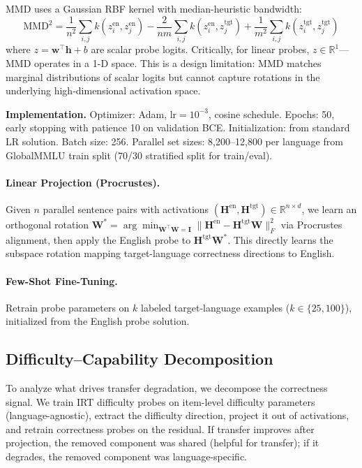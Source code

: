\documentclass[11pt,a4paper]{article}
\begin{document}
MMD uses a Gaussian RBF kernel with median-heuristic bandwidth:
\begin{equation}
\text{MMD}^2 = \frac{1}{n^2}\sum_{i,j} k(z_i^{\text{en}}, z_j^{\text{en}}) - \frac{2}{nm}\sum_{i,j} k(z_i^{\text{en}}, z_j^{\text{tgt}}) + \frac{1}{m^2}\sum_{i,j} k(z_i^{\text{tgt}}, z_j^{\text{tgt}})
\end{equation}
where $z = \mathbf{w}^\top \mathbf{h} + b$ are scalar probe logits. Critically, for linear probes, $z \in \mathbb{R}^1$---MMD operates in a 1-D space. This is a design limitation: MMD matches marginal distributions of scalar logits but cannot capture rotations in the underlying high-dimensional activation space.

\textbf{Implementation.} Optimizer: Adam, $\text{lr}=10^{-3}$, cosine schedule. Epochs: 50, early stopping with patience 10 on validation BCE. Initialization: from standard LR solution. Batch size: 256. Parallel set sizes: 8,200--12,800 per language from GlobalMMLU train split (70/30 stratified split for train/eval).

\paragraph{Linear Projection (Procrustes).}
Given $n$ parallel sentence pairs with activations $(\mathbf{H}^{\text{en}}, \mathbf{H}^{\text{tgt}}) \in \mathbb{R}^{n \times d}$, we learn an orthogonal rotation $\mathbf{W}^* = \arg\min_{\mathbf{W}^\top\mathbf{W}=\mathbf{I}} \|\mathbf{H}^{\text{en}} - \mathbf{H}^{\text{tgt}}\mathbf{W}\|_F^2$ via Procrustes alignment, then apply the English probe to $\mathbf{H}^{\text{tgt}}\mathbf{W}^*$. This directly learns the subspace rotation mapping target-language correctness directions to English.

\paragraph{Few-Shot Fine-Tuning.}
Retrain probe parameters on $k$ labeled target-language examples ($k \in \{25, 100\}$), initialized from the English probe solution.

\subsection{Difficulty--Capability Decomposition}
To analyze what drives transfer degradation, we decompose the correctness signal. We train IRT difficulty probes on item-level difficulty parameters (language-agnostic), extract the difficulty direction, project it out of activations, and retrain correctness probes on the residual. If transfer improves after projection, the removed component was shared (helpful for transfer); if it degrades, the removed component was language-specific.
\end{document}
